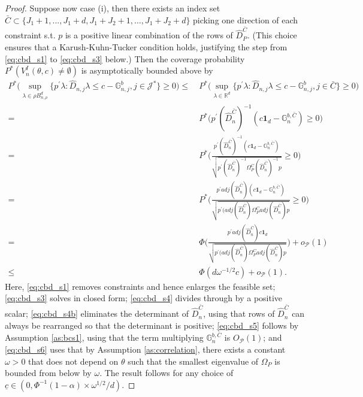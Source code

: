 \documentclass[letterpaper,11pt]{article}
\theoremstyle{myplain}
\theoremstyle{mydefinition}
\theoremstyle{myremark}
\newcommand{\G}{\mathbb{G}}
\newcommand{\cJ}{\mathcal{J}}
\newcommand{\cP}{\mathcal{P}}
\numberwithin{equation}{section}
\numberwithin{figure}{section}
\begin{document}
\begin{appendices}
\begin{proof}
Suppose now case (i), then there exists an index set ${\bar C}\subset \{J_1+1,...,J_1+d,J_1+J_2+1,\dots,J_1+J_2+d\}$ picking one direction of each constraint s.t. $p$ is a positive linear combination of the rows of $\hat{D}_{P}^{\bar C}$. (This choice ensures that a Karush-Kuhn-Tucker condition holds, justifying the step from \eqref{eq:cbd_s1} to \eqref{eq:cbd_s3} below.) Then the  coverage probability $P^*(V^I_n(\theta,c)\ne\emptyset)$ is asymptotically bounded above by
\begin{align}
P^* \Big( \sup_{\lambda \in \rho B^d_{n,\rho}} \Big\{ p^{\prime }\lambda:\hat{D}_{n,j}\lambda \leq c-\G_{n,j}^b,j \in \cJ^{*}\Big\} \geq 0 \Big) \leq &~ P^* \Big( \sup_{\lambda \in \mathbb{R}^d} \Big\{ p^{\prime }\lambda:\hat{D}_{n,j}\lambda \leq c-\G_{n,j}^b,j \in \bar C\Big\} \geq 0 \Big) \label{eq:cbd_s1}\\
=&~ P^* \Big(p^{\prime} (\hat{D}_{n}^{\bar C})^{-1}(c\mathbf{1}_d-\G^{b,\bar C}_n) \geq 0 \Big) \label{eq:cbd_s3}\\
=&~ P^* \bigg( \frac{p^{\prime} (\hat{D}_{n}^{\bar C})^{-1}(c\mathbf{1}_d-\G^{b,\bar C}_n)}{\sqrt{p^\prime(\hat{D}_{n}^{\bar C})^{-1}\Omega_P^C (\hat{D}_{n}^{\bar C})^{-1}p}} \geq 0 \bigg)\label{eq:cbd_s4} \\
=&~ P^* \bigg( \frac{p^{\prime} adj(\hat{D}_{n}^{\bar C})(c\mathbf{1}_d-\G^{b,\bar C}_n)}{\sqrt{p^\prime(adj(\hat{D}_{n}^{\bar C})\Omega_P^C adj(\hat{D}_{n}^{\bar C})p}} \geq 0 \bigg)\label{eq:cbd_s4b} \\
=&~ \Phi \bigg(\frac{p^\prime adj(\hat{D}_{n}^{\bar C})c\mathbf{1}_d}{\sqrt{p^\prime(adj(\hat{D}_{n}^{\bar C})\Omega_P^C adj(\hat{D}_{n}^{\bar C})p}} \bigg) + o_{\cP}(1) \label{eq:cbd_s5}\\
\leq &~ \Phi (d \omega^{-1/2} c) + o_{\cP}(1).\label{eq:cbd_s6}
\end{align}
Here, \eqref{eq:cbd_s1} removes constraints and hence enlarges the feasible set; \eqref{eq:cbd_s3} solves in closed form; \eqref{eq:cbd_s4} divides through by a positive scalar; \eqref{eq:cbd_s4b} eliminates the determinant of $\hat{D}_{n}^{\bar C}$, using that rows of $\hat{D}_{n}^{\bar C}$ can always be rearranged so that the determinant is positive; \eqref{eq:cbd_s5} follows by Assumption \ref{as:bcs1}, using that the term multiplying $\G^{b,\bar C}_{n}$ is $O_{\cP}(1)$; and \eqref{eq:cbd_s6} uses that by Assumption \ref{as:correlation}, there exists a constant $\omega>0$ that does not depend on $\theta$ such that the smallest eigenvalue of $\Omega_P$ is bounded from below by $\omega$. The result follows for any choice of $\underline{c} \in (0,\Phi
	^{-1}(1-\alpha )\times  \omega^{1/2}/d)$.
	

\end{proof}
\end{appendices}
\end{document}
